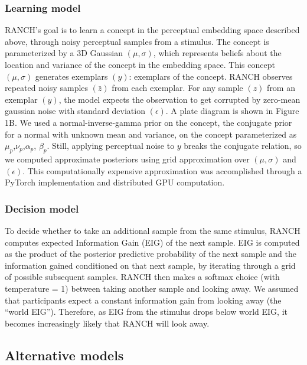 \documentclass[10pt, letterpaper]{article}
\begin{document}
\hypertarget{learning-model}{%
\subsubsection{Learning model}\label{learning-model}}

RANCH's goal is to learn a concept in the perceptual embedding space
described above, through noisy perceptual samples from a stimulus. The
concept is parameterized by a 3D Gaussian \((\mu,\sigma)\), which
represents beliefs about the location and variance of the concept in the
embedding space. This concept \((\mu,\sigma)\) generates exemplars
\((y)\): exemplars of the concept. RANCH observes repeated noisy samples
\((\bar{z})\) from each exemplar. For any sample \((z)\) from an
exemplar \((y)\), the model expects the observation to get corrupted by
zero-mean gaussian noise with standard deviation \((\epsilon)\). A plate
diagram is shown in Figure 1B. We used a normal-inverse-gamma prior on
the concept, the conjugate prior for a normal with unknown mean and
variance, on the concept parameterized as
\(\mu_{p}\),\(\nu_{p}\),\(\alpha_{p}\), \(\beta_{p}\). Still, applying
perceptual noise to \(y\) breaks the conjugate relation, so we computed
approximate posteriors using grid approximation over \((\mu,\sigma)\)
and \((\epsilon)\). This computationally expensive approximation was
accomplished through a PyTorch implementation and distributed GPU
computation.

\hypertarget{decision-model}{%
\subsubsection{Decision model}\label{decision-model}}

To decide whether to take an additional sample from the same stimulus,
RANCH computes expected Information Gain (EIG) of the next sample. EIG
is computed as the product of the posterior predictive probability of
the next sample and the information gained conditioned on that next
sample, by iterating through a grid of possible subsequent samples.
RANCH then makes a softmax choice (with temperature = 1) between taking
another sample and looking away. We assumed that participants expect a
constant information gain from looking away (the ``world EIG'').
Therefore, as EIG from the stimulus drops below world EIG, it becomes
increasingly likely that RANCH will look away.

\hypertarget{alternative-models}{%
\subsection{Alternative models}\label{alternative-models}}
\end{document}
